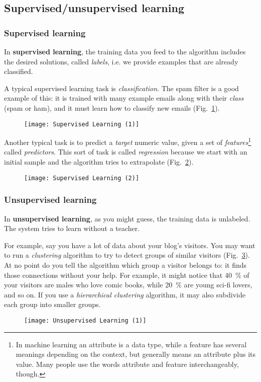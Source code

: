 \subsection{Supervised/unsupervised learning}
\subsubsection{Supervised learning}
In \textbf{supervised learning}, the training data you feed to the algorithm includes the desired solutions, called \emph{labels}, i.e. we provide examples that are already classified.

A typical supervised learning task is \emph{classification}. The spam filter is a good example of this: it is trained with many example emails along with their \emph{class} (spam or ham), and it must learn how to classify new emails (Fig.~\ref{SupervisedLearning1}).
\begin{figure}[h!t]
\centering
\texttt{[image: Supervised Learning (1)]}
\caption{}\label{SupervisedLearning1}
\end{figure}

Another typical task is to predict a \emph{target} numeric value, given a set of \emph{features}\footnote{In machine learning an attribute is a data type, while a feature has several meanings depending on the context, but
generally means an attribute plus its value. Many people use the words attribute and feature interchangeably, though.} called \emph{predictors}. This sort of task is called \emph{regression} because we start with an initial sample and the algorithm tries to extrapolate (Fig.~\ref{SupervisedLearning2}).
\begin{figure}[h!t]
\centering
\texttt{[image: Supervised Learning (2)]}
\caption{}\label{SupervisedLearning2}
\end{figure}
\subsubsection{Unsupervised learning}
In \textbf{unsupervised learning}, as you might guess, the training data is unlabeled. The system tries to learn without a teacher.

For example, say you have a lot of data about your blog’s visitors. You may want to run a \emph{clustering} algorithm to try to detect groups of similar visitors (Fig.~\ref{UnsupervisedLearning1}). At no point do you tell the algorithm which group a visitor belongs to: it finds those connections without your help. For example, it might notice that \SI{40}{\percent} of your visitors are males who love comic books, while \SI{20}{\percent} are young sci-fi lovers, and so on. If you use a \emph{hierarchical clustering} algorithm, it may also subdivide each group into smaller groups.
\begin{figure}[h!t]
\centering
\texttt{[image: Unsupervised Learning (1)]}
\caption{}\label{UnsupervisedLearning1}
\end{figure}

